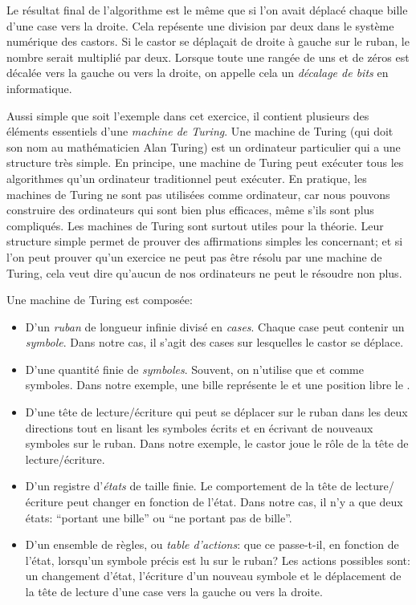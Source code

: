\documentclass[a4paper,11pt]{report}
\newcommand{\BrochureInlineCode}[1]{{\ttfamily #1}}
\begin{document}
Le résultat final de l’algorithme est le même que si l’on avait déplacé chaque bille d’une case vers la droite. Cela repésente une division par deux dans le système numérique des castors. Si le castor se déplaçait de droite à gauche sur le ruban, le nombre serait multiplié par deux. Lorsque toute une rangée de uns et de zéros est décalée vers la gauche ou vers la droite, on appelle cela un \emph{décalage de bits} en informatique.

Aussi simple que soit l’exemple dans cet exercice, il contient plusieurs des éléments essentiels d’une \emph{machine de Turing}.
Une machine de Turing (qui doit son nom au mathématicien Alan Turing) est un ordinateur particulier qui a une structure très simple. En principe, une machine de Turing peut exécuter tous les algorithmes qu’un ordinateur traditionnel peut exécuter. En pratique, les machines de Turing ne sont pas utilisées comme ordinateur, car nous pouvons construire des ordinateurs qui sont bien plus efficaces, même s’ils sont plus compliqués. Les machines de Turing sont surtout utiles pour la théorie. Leur structure simple permet de prouver des affirmations simples les concernant; et si l’on peut prouver qu’un exercice ne peut pas être résolu par une machine de Turing, cela veut dire qu’aucun de nos ordinateurs ne peut le résoudre non plus.

Une machine de Turing est composée:

\begin{itemize}
  \item D’un \emph{ruban} de longueur infinie divisé en \emph{cases}. Chaque case peut contenir un \emph{symbole}. Dans notre cas, il s’agit des cases sur lesquelles le castor se déplace.
  \item D’une quantité finie de \emph{symboles}. Souvent, on n’utilise que \BrochureInlineCode{0} et \BrochureInlineCode{1} comme symboles. Dans notre exemple, une bille représente le \BrochureInlineCode{1} et une position libre le \BrochureInlineCode{0}.
  \item D’une tête de lecture/écriture qui peut se déplacer sur le ruban dans les deux directions tout en lisant les symboles écrits et en écrivant de nouveaux symboles sur le ruban. Dans notre exemple, le castor joue le rôle de la tête de lecture/écriture.
  \item D’un registre d’\emph{états} de taille finie. Le comportement de la tête de lecture/écriture peut changer en fonction de l’état. Dans notre cas, il n’y a que deux états: “portant une bille” ou “ne portant pas de bille”.
  \item D’un ensemble de règles, ou \emph{table d’actions}: que ce passe-t-il, en fonction de l’état, lorsqu’un symbole précis est lu sur le ruban? Les actions possibles sont: un changement d’état, l’écriture d’un nouveau symbole et le déplacement de la tête de lecture d’une case vers la gauche ou vers la droite.
\end{itemize}
\end{document}
